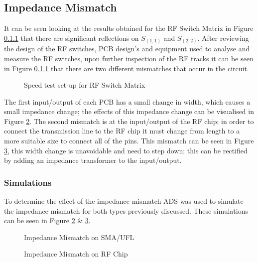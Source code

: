 \documentclass[12pt,openany,a4paper]{book}
\begin{document}
\subsection{Impedance Mismatch}	\label{sec:imp-mismatch}
It can be seen looking at the results obtained for the RF Switch Matrix in Figure \ref{} that there are significant reflections on $S_{(1,1)}$ and $S_{(2,2)}$. After reviewing the design of the RF switches, PCB design's and equipment used to analyse and measure the RF switches, upon further inspection of the RF tracks it can be seen in Figure \ref{} that there are two different mismatches that occur in the circuit.
\begin{figure}[H]
	\centering
	\caption{Speed test set-up for RF Switch Matrix}
	\label{fig:speedtest}
\end{figure} 
The first input/output of each PCB has a small change in width, which causes a small impedance change; the effects of this impedance change can be visualised in Figure \ref{fig:imp-mismatch-1}. The second mismatch is at the input/output of the RF chip; in order to connect the transmission line to the RF chip it must change from length to a more suitable size to connect all of the pins. This mismatch can be seen in Figure \ref{fig:imp-mismatch-2}, this width change is unavoidable and need to step down; this can be rectified by adding an impedance transformer to the input/output.

\subsubsection{Simulations}
To determine the effect of the impedance mismatch ADS was used to simulate the impedance mismatch for both types previously discussed. These simulations can be seen in Figure \ref{fig:imp-mismatch-1} \& \ref{fig:imp-mismatch-2}.
\begin{figure}[H]
	\centering
	\caption{Impedance Mismatch on SMA/UFL}
	\label{fig:imp-mismatch-1}
\end{figure} 
\begin{figure}[H]
	\centering
	\caption{Impedance Mismatch on RF Chip}
	\label{fig:imp-mismatch-2}
\end{figure} 
\end{document}

